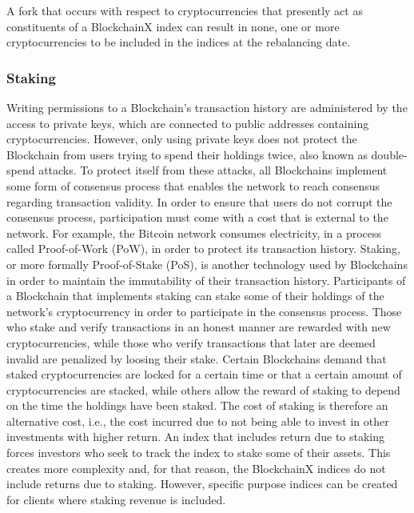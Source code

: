 \documentclass{article}
\begin{document}
A fork that occurs with respect to cryptocurrencies that presently act as constituents of a BlockchainX index can result in none, one or more cryptocurrencies to be included in the indices at the rebalancing date.

\hfill



\subsubsection{Staking}

Writing permissions to a Blockchain’s transaction history are administered by the access to private keys, which are connected to public addresses containing cryptocurrencies. However, only using private keys does not protect the Blockchain from users trying to spend their holdings twice, also known as double-spend attacks. To protect itself from these attacks, all Blockchains implement some form of consensus process that enables the network to reach consensus regarding transaction validity. In order to ensure that users do not corrupt the consensus process, participation must come with a cost that is external to the network. For example, the Bitcoin network consumes electricity, in a process called Proof-of-Work (PoW), in order to protect its transaction history. Staking, or more formally Proof-of-Stake (PoS), is another technology used by Blockchains in order to maintain the immutability of their transaction history. Participants of a Blockchain that implements staking can stake some of their holdings of the network’s cryptocurrency in order to participate in the consensus process. Those who stake and verify transactions in an honest manner are rewarded with new cryptocurrencies, while those who verify transactions that later are deemed invalid are penalized by loosing their stake. Certain Blockchains demand that staked cryptocurrencies are locked for a certain time or that a certain amount of cryptocurrencies are stacked, while others allow the reward of staking to depend on the time the holdings have been staked. The cost of staking is therefore an alternative cost, i.e., the cost incurred due to not being able to invest in other investments with higher return. An index that includes return due to staking forces investors who seek to track the index to stake some of their assets. This creates more complexity and, for that reason, the BlockchainX indices do not include returns due to staking. However, specific purpose indices can be created for clients  where staking revenue is included.
\end{document}
